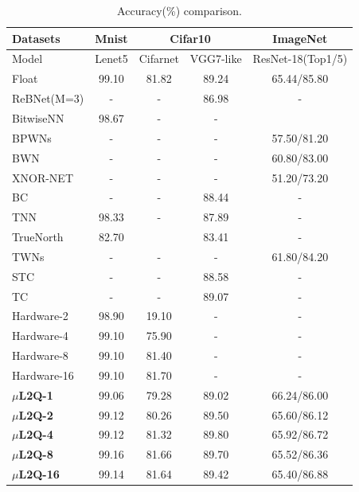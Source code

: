 \begin{table}[]
\center
\caption{Accuracy(\%) comparison.}
\label{tab:accuracy_comp}
\begin{tabular}{l|c|c|c|c}
\hline
Datasets    & Mnist  &\multicolumn{2}{c|}{Cifar10}   & ImageNet \\ \hline \hline
Model       & Lenet5 & Cifarnet & VGG7-like & ResNet-18(Top1/5)\\ \hline
Float       & 99.10  & 81.82    & 89.24  &65.44/85.80 \\\hline
ReBNet(M=3)\citep{ghasemzadeh2018rebnet} & -  &  -        & 86.98  &- \\
BitwiseNN\citep{BitwiseNN} &	98.67 &		- &-\\
BPWNs\citep{TWNs}  & -  &  -        & -  &57.50/81.20 \\
BWN\citep{rastegari2016xnor}  & -  &  -        & -  &60.80/83.00 \\
XNOR-NET\citep{rastegari2016xnor}  & -  &  -        & -  &51.20/73.20 \\
BC\citep{Binaryconnect}		&-&-&	88.44 &-\\\hline
TNN\citep{alemdar2017ternary}         & 98.33  &  -        & 87.89  &- \\
TrueNorth\citep{TrueNorth1} &	82.70 &		& 83.41 &- \\
TWNs\citep{TWNs}   & -  &  -        & -  &61.80/84.20 \\
STC\citep{jin2018sparse}&-&-&88.58&-\\
TC\citep{Ternaryconnect}		&-&-&	89.07&-\\\hline
Hardware-2\citep{gysel2016hardware} &	98.90 &	19.10 &-&-\\
Hardware-4\citep{gysel2016hardware} &	99.10 &	75.90 &-&-\\
Hardware-8\citep{gysel2016hardware} &	99.10 &	81.40 &-&-\\
Hardware-16\citep{gysel2016hardware} &	99.10 &	81.70 &-&-\\\hline
\textbf{$\mu$L2Q-1}       & 99.06  & 79.28    & 89.02  &66.24/86.00 \\
\textbf{$\mu$L2Q-2}       & 99.12  & 80.26    & 89.50 &65.60/86.12\\
\textbf{$\mu$L2Q-4}       & 99.12  & 81.32    & 89.80 &65.92/86.72 \\
\textbf{$\mu$L2Q-8}       & 99.16  & 81.66    & 89.70 &65.52/86.36 \\
\textbf{$\mu$L2Q-16}      & 99.14  &  81.64   & 89.42  &65.40/86.88 \\
\hline
\end{tabular}
\end{table}

